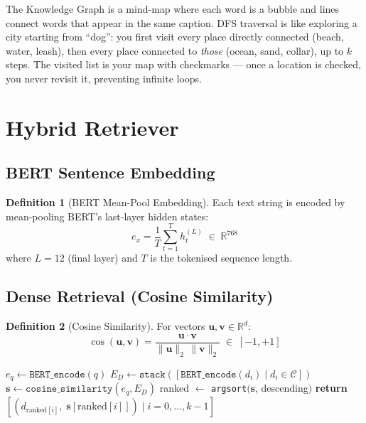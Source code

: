 \documentclass[12pt, a4paper]{article}
\theoremstyle{definition}
\newtheorem{definition}{Definition}[section]
\theoremstyle{plain}
\theoremstyle{remark}
\begin{document}
\begin{tcolorbox}[layman]
The Knowledge Graph is a mind-map where each word is a bubble and lines
connect words that appear in the same caption.  DFS traversal is like
exploring a city starting from ``dog'': you first visit every place
directly connected (beach, water, leash), then every place connected to
\emph{those} (ocean, sand, collar), up to $k$ steps.  The visited list
is your map with checkmarks --- once a location is checked, you never
revisit it, preventing infinite loops.
\end{tcolorbox}

\section{Hybrid Retriever}
\label{sec:retriever}

\subsection{BERT Sentence Embedding}

\begin{definition}[BERT Mean-Pool Embedding]
Each text string is encoded by mean-pooling BERT's last-layer hidden states:
\[
  e_x = \frac{1}{T}\sum_{t=1}^{T} h_t^{(L)} \;\in\; \mathbb{R}^{768}
\]
where $L=12$ (final layer) and $T$ is the tokenised sequence length.
\end{definition}

\subsection{Dense Retrieval (Cosine Similarity)}

\begin{definition}[Cosine Similarity]
For vectors $\mathbf{u}, \mathbf{v} \in \mathbb{R}^d$:
\[
  \cos(\mathbf{u}, \mathbf{v}) =
  \frac{\mathbf{u}\cdot\mathbf{v}}{\|\mathbf{u}\|_2\,\|\mathbf{v}\|_2} \;\in\; [-1,+1]
\]
\end{definition}

\begin{algorithm}[H]
\caption{Dense Retrieval --- Algorithm 3}
\label{alg:dense}
\begin{algorithmic}[1]
  \State $e_q \gets \texttt{BERT\_encode}(q)$ 
  \State $E_D \gets \texttt{stack}([\texttt{BERT\_encode}(d_i) \mid d_i \in \mathcal{C}])$
  \State $\mathbf{s} \gets \texttt{cosine\_similarity}(e_q, E_D)$
  \State ranked $\gets$ \texttt{argsort}$(\mathbf{s}$, descending$)$
  \State \textbf{return} $[(d_{\text{ranked}[i]},\;\mathbf{s}[\text{ranked}[i]]) \mid i=0,\ldots,k-1]$
\EndProcedure
\end{algorithmic}
\end{algorithm}
\end{document}
